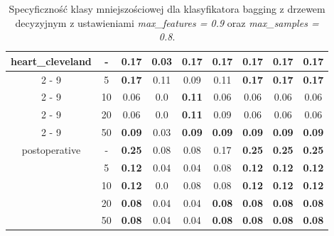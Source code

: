 \begin{table}[H]
\begin{center}
{\begin{tabular}{c|c|ccccccc}
				\hline%
				\multirow{5}{*}{heart\_cleveland}&{-}&\textbf{0.17}&0.03&\textbf{0.17}&\textbf{0.17}&\textbf{0.17}&\textbf{0.17}&\textbf{0.17}\\%
				\cline{2%
					-%
					9}%
				&5&\textbf{0.17}&0.11&0.09&0.11&\textbf{0.17}&\textbf{0.17}&\textbf{0.17}\\%
				\cline{2%
					-%
					9}%
				&10&0.06&0.0&\textbf{0.11}&0.06&0.06&0.06&0.06\\%
				\cline{2%
					-%
					9}%
				&20&0.06&0.0&\textbf{0.11}&0.09&0.06&0.06&0.06\\%
				\cline{2%
					-%
					9}%
				&50&\textbf{0.09}&0.03&\textbf{0.09}&\textbf{0.09}&\textbf{0.09}&\textbf{0.09}&\textbf{0.09}\\%
				\hline%
				\multirow{5}{*}{postoperative}&{-}&\textbf{0.25}&0.08&0.08&0.17&\textbf{0.25}&\textbf{0.25}&\textbf{0.25}\\%
				\cline{2%
					-%
					9}%
				&5&\textbf{0.12}&0.04&0.04&0.08&\textbf{0.12}&\textbf{0.12}&\textbf{0.12}\\%
				\cline{2%
					-%
					9}%
				&10&\textbf{0.12}&0.0&0.08&0.08&\textbf{0.12}&\textbf{0.12}&\textbf{0.12}\\%
				\cline{2%
					-%
					9}%
				&20&\textbf{0.08}&0.04&0.04&\textbf{0.08}&\textbf{0.08}&\textbf{0.08}&\textbf{0.08}\\%
				\cline{2%
					-%
					9}%
				&50&\textbf{0.08}&0.04&0.04&\textbf{0.08}&\textbf{0.08}&\textbf{0.08}&\textbf{0.08}\\%
				\hline%
			\end{tabular}
			}
			\caption{Specyficzność klasy mniejszościowej dla klasyfikatora bagging z drzewem decyzyjnym z ustawieniami \textit{max\_features = 0.9} oraz \textit{max\_samples = 0.8}.}
			\label{baggingdrzewo2spec2}
		\end{center}
	\end{table}

	
